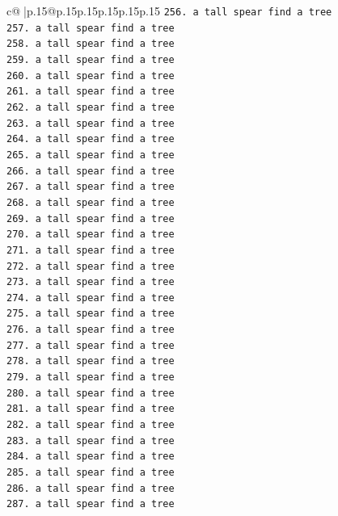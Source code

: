 \documentclass{article}
\begin{document}
{\begin{supertabular}{c@{$\;$}|p{.15\linewidth}@{}p{.15\linewidth}p{.15\linewidth}p{.15\linewidth}p{.15\linewidth}p{.15\linewidth}}
{{{\texttt{256. a tall spear find a tree} \\
\texttt{257. a tall spear find a tree} \\
\texttt{258. a tall spear find a tree} \\
\texttt{259. a tall spear find a tree} \\
\texttt{260. a tall spear find a tree} \\
\texttt{261. a tall spear find a tree} \\
\texttt{262. a tall spear find a tree} \\
\texttt{263. a tall spear find a tree} \\
\texttt{264. a tall spear find a tree} \\
\texttt{265. a tall spear find a tree} \\
\texttt{266. a tall spear find a tree} \\
\texttt{267. a tall spear find a tree} \\
\texttt{268. a tall spear find a tree} \\
\texttt{269. a tall spear find a tree} \\
\texttt{270. a tall spear find a tree} \\
\texttt{271. a tall spear find a tree} \\
\texttt{272. a tall spear find a tree} \\
\texttt{273. a tall spear find a tree} \\
\texttt{274. a tall spear find a tree} \\
\texttt{275. a tall spear find a tree} \\
\texttt{276. a tall spear find a tree} \\
\texttt{277. a tall spear find a tree} \\
\texttt{278. a tall spear find a tree} \\
\texttt{279. a tall spear find a tree} \\
\texttt{280. a tall spear find a tree} \\
\texttt{281. a tall spear find a tree} \\
\texttt{282. a tall spear find a tree} \\
\texttt{283. a tall spear find a tree} \\
\texttt{284. a tall spear find a tree} \\
\texttt{285. a tall spear find a tree} \\
\texttt{286. a tall spear find a tree} \\
\texttt{287. a tall spear find a tree} \\
}}}
\end{supertabular}}
\end{document}

